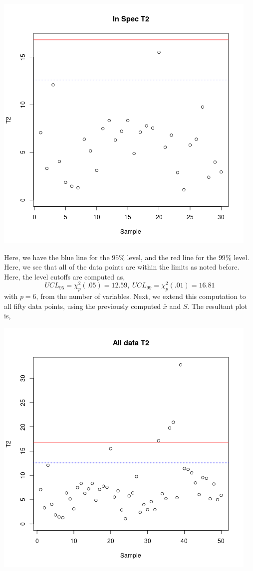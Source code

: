 \documentclass[letterpaper,10pt]{article}
\begin{document}
\begin{enumerate}
\begin{center}
\includegraphics[scale=.75]{inspec.png}
\end{center}
Here, we have the blue line for the $95\%$ level, and the red line for the $99\%$ level. Here, we see that all of the data points are within the limits as noted before. Here, the level cutoffs are computed as,
\[UCL_{95}=\chi^2_p(.05)=12.59,\ UCL_{99}=\chi^2_p(.01)=16.81\]
with $p=6$, from the number of variables. Next, we extend this computation to all fifty data points, using the previously computed $\bar{x}$ and $S$. The resultant plot is,
\begin{center}
\includegraphics[scale=.75]{outspec.png}

\end{center}
\end{enumerate}
\end{document}
